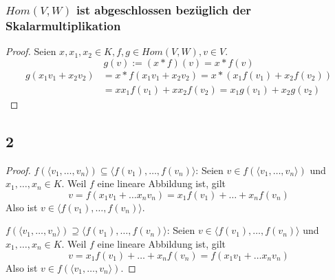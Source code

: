 \documentclass[a4paper,10pt]{article}
\begin{document}
\subsubsection*{$Hom(V, W)$ ist abgeschlossen bezüglich der Skalarmultiplikation}

\begin{proof}
 Seien $x, x_1, x_2 \in K, f, g \in Hom(V, W), v \in V$.
 \begin{equation}
  g(v) := (x * f)(v) = x * f(v)
 \end{equation}
 \begin{align*}
  g(x_1v_1 + x_2v_2) & = x * f(x_1v_1 + x_2v_2) = x * (x_1f(v_1) + x_2f(v_2))\\
  & = xx_1f(v_1) + xx_2f(v_2) = x_1g(v_1) + x_2g(v_2)
 \end{align*}

\end{proof}

\subsection*{2}

\begin{proof}
 $f(\langle v_1, \dots, v_n \rangle) \subseteq \langle f(v_1), \dots, f(v_n) \rangle$: Seien $v \in f(\langle v_1, \dots, v_n \rangle)$ und $x_1, \dots, x_n \in K$.
 Weil $f$ eine lineare Abbildung ist, gilt
 \begin{equation}
  v = f(x_1v_1 + \dots x_nv_n) = x_1f(v_1) + \dots + x_nf(v_n)
 \end{equation}
 Also ist $v \in \langle f(v_1), \dots, f(v_n) \rangle$.
 
 $f(\langle v_1, \dots, v_n \rangle) \supseteq \langle f(v_1), \dots, f(v_n) \rangle$: Seien $v \in \langle f(v_1), \dots, f(v_n) \rangle$ und $x_1, \dots, x_n \in K$.
 Weil $f$ eine lineare Abbildung ist, gilt
 \begin{equation}
  v = x_1f(v_1) + \dots + x_nf(v_n) = f(x_1v_1 + \dots x_nv_n)
 \end{equation}
 Also ist $v \in f(\langle v_1, \dots, v_n \rangle)$.
\end{proof}
\end{document}
